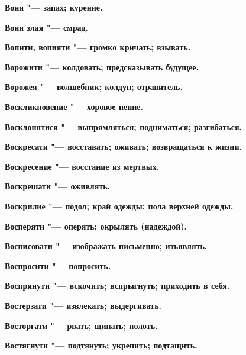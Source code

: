 \bfseries Воня \normalfont{} "--- запах; курение. 




\bfseries Воня злая \normalfont{} "--- смрад. 




\bfseries Вопити, вопияти \normalfont{} "--- громко кричать; взывать. 




\bfseries Ворожити \normalfont{} "--- колдовать; предсказывать будущее. 




\bfseries Ворожея \normalfont{} "--- волшебник; колдун; отравитель. 




\bfseries Воскликновение \normalfont{} "--- хоровое пение. 




\bfseries Восклонятися \normalfont{} "--- выпрямляться; подниматься; разгибаться. 




\bfseries Воскресати \normalfont{} "--- восставать; оживать; возвращаться к жизни. 




\bfseries Воскресение \normalfont{} "--- восстание из мертвых. 




\bfseries Воскрешати \normalfont{} "--- оживлять. 




\bfseries Воскрилие \normalfont{} "--- подол; край одежды; пола верхней одежды. 




\bfseries Восперяти \normalfont{} "--- оперять; окрылять (надеждой). 




\bfseries Восписовати \normalfont{} "--- изображать письменно; изъявлять. 




\bfseries Воспросити \normalfont{} "--- попросить. 




\bfseries Воспрянути \normalfont{} "--- вскочить; вспрыгнуть; приходить в себя. 




\bfseries Востерзати \normalfont{} "--- извлекать; выдергивать. 




\bfseries Восторгати \normalfont{} "--- рвать; щипать; полоть. 




\bfseries Востягнути \normalfont{} "--- подтянуть; укрепить; подтащить. 




